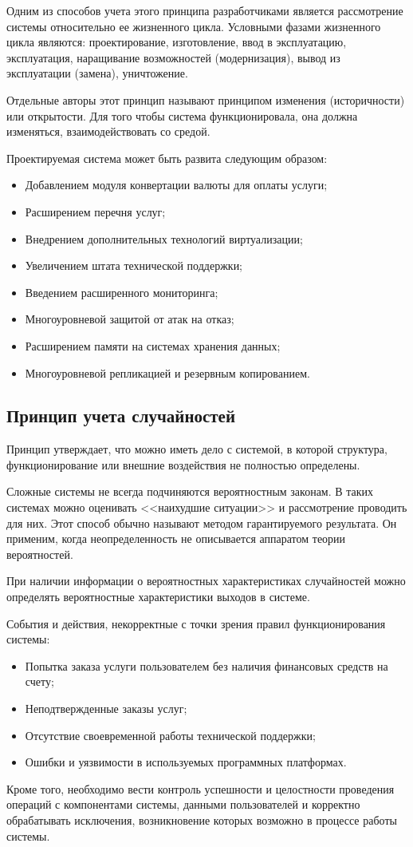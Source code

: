 Одним из способов учета этого принципа разработчиками является рассмотрение системы относительно ее жизненного цикла.
Условными фазами жизненного цикла являются: проектирование, изготовление, ввод в эксплуатацию, эксплуатация, наращивание возможностей (модернизация), вывод из эксплуатации (замена), уничтожение.

Отдельные авторы этот принцип называют принципом изменения (историчности) или открытости.
Для того чтобы система функционировала, она должна изменяться, взаимодействовать со средой.

Проектируемая система может быть развита следующим образом:
\begin{itemize}
  \item Добавлением модуля конвертации валюты для оплаты услуги;
  \item Расширением перечня услуг;
  \item Внедрением дополнительных технологий виртуализации;
  \item Увеличением штата технической поддержки;
  \item Введением расширенного мониторинга;
  \item Многоуровневой защитой от атак на отказ;
  \item Расширением памяти на системах хранения данных;
  \item Многоуровневой репликацией и резервным копированием.
\end{itemize}

\subsection{Принцип учета случайностей}

Принцип утверждает, что можно иметь дело с системой, в которой структура, функционирование или внешние воздействия не полностью определены.

Сложные системы не всегда подчиняются вероятностным законам.
В таких системах можно оценивать <<наихудшие ситуации>> и рассмотрение проводить для них.
Этот способ обычно называют методом гарантируемого результата.
Он применим, когда неопределенность не описывается аппаратом теории вероятностей.

При наличии информации о вероятностных характеристиках случайностей можно определять вероятностные характеристики выходов в системе.

События и действия, некорректные с точки зрения правил функционирования системы:
\begin{itemize}
  \item Попытка заказа услуги пользователем без наличия финансовых средств на счету;
  \item Неподтвержденные заказы услуг;
  \item Отсутствие своевременной работы технической поддержки;
  \item Ошибки и уязвимости в используемых программных платформах.
\end{itemize}

Кроме того, необходимо вести контроль успешности и целостности проведения операций с компонентами системы, данными пользователей и корректно обрабатывать исключения, возникновение которых возможно в процессе работы системы.



\clearpage
